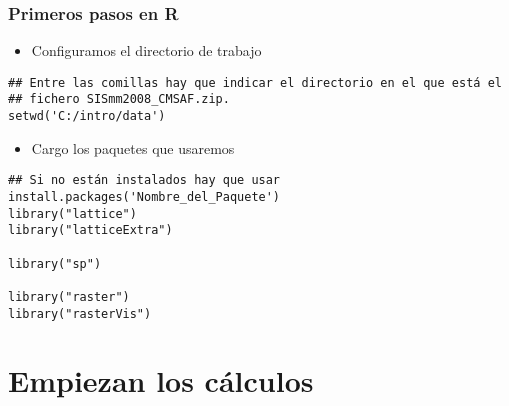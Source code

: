 \documentclass[xcolor={usenames,svgnames,dvipsnames}]{beamer}
\begin{document}
\begin{frame}[fragile]
\frametitle{Primeros pasos en R}
\label{sec-1-3}

\begin{itemize}
\item Configuramos el directorio de trabajo
\end{itemize}

\lstset{language=R}
\begin{lstlisting}
## Entre las comillas hay que indicar el directorio en el que está el
## fichero SISmm2008_CMSAF.zip.
setwd('C:/intro/data')
\end{lstlisting}
\begin{itemize}
\item Cargo los paquetes que usaremos
\end{itemize}

\lstset{language=R}
\begin{lstlisting}
## Si no están instalados hay que usar install.packages('Nombre_del_Paquete')
library("lattice")
library("latticeExtra")

library("sp")

library("raster")
library("rasterVis")
\end{lstlisting}
\end{frame}
\section{Empiezan los cálculos}
\label{sec-2}
\end{document}

